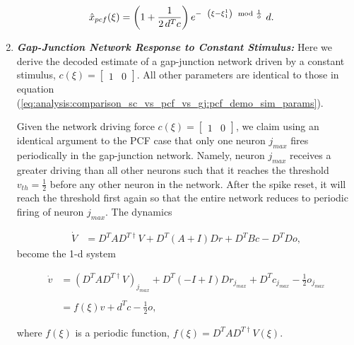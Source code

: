 \begin{enumerate}
\begin{align}	\label{eq:analysis:comparison_sc_vs_pcf_vs_gj:const_dynamics:pcf_network_estimate_steady_state}
\hat{x}_{pcf}(\xi)
&= 
\left(
1 + 
\frac
{
	1
}
{
	2 \, d^T c
}
\right)
e^
{
	- \hspace{2mm}
	\left(
		\xi - \xi_1^1
	\right)
	\mod
	{
		\frac
		{
			1
		}
		{
			\phi
		}
	}
}
\, \, d.
\end{align}

\item \textbf{\textit{Gap-Junction Network Response to Constant Stimulus:}} Here we derive the decoded estimate of a gap-junction network driven by a constant stimulus, $c(\xi) = \begin{bmatrix}
1 & 0
\end{bmatrix}
$. All other parameters are identical to those in equation (\ref{eq:analysis:comparison_sc_vs_pcf_vs_gj:pcf_demo_sim_params}).

Given the network driving force $c(\xi) = \begin{bmatrix}
1 & 0
\end{bmatrix}$, 
we claim using an identical argument to the PCF case that only one neuron $j_{max}$ fires periodically in the gap-junction network. Namely, neuron $j_{max}$ receives a greater driving than all other neurons such that it reaches the threshold $v_{th} = \frac{1}{2}$ before any other neuron in the network. After the spike reset, it will reach the threshold first again so that the entire network reduces to periodic firing of neuron $j_{max}$. The dynamics

\begin{align*}
\dot{V}
&= 
D^T A
D^{T \dagger} V 
+
D^T
\left(
	A + I 
\right)
D r
+ 
D^T B c
- D^T D o,
\end{align*}
become the 1-d system

\begin{align*}
\dot{v}
&= 
\left(
D^T A
D^{T \dagger} V 
\right)
_{j_{max}}
+
D^T
\left(
	-I + I 
\right)
D r_{j_{max}}
+ 
D^T c_{j_{max}}
- \frac{1}{2} o_{j_{max}}
%
\\
\\
%
&= 
f(\xi) v
+
d^T c - \frac{1}{2} o,
\end{align*}

where $f(\xi)$ is a periodic function, $f(\xi) = D^T A D^{T \dagger} V(\xi)$.



\end{enumerate}
